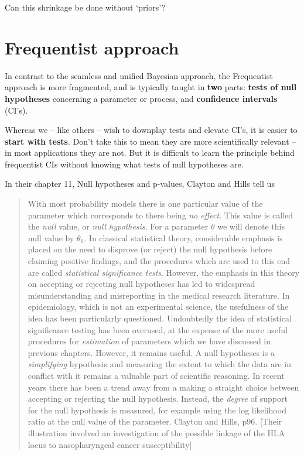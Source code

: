 \documentclass[]{book}
\begin{document}
Can this shrinkage be done without `priors'?

\hypertarget{frequentist-approach}{%
\section{Frequentist approach}\label{frequentist-approach}}

In contrast to the seamless and unified Bayesian approach, the Frequentist approach is more fragmented, and is typically taught in \textbf{two} parts: \textbf{tests of null hypotheses} concerning a parameter or process, and \textbf{confidence intervals} (CI's).

Whereas we -- like others -- wish to downplay tests and elevate CI's,
it is easier to \textbf{start with tests}. Don't take this to mean they are more scientifically relevant -- in most applications they are not. But it is difficult to learn the principle behind frequentist CIs without knowing what tests of null hypotheses are.

In their chapter 11, Null hypotheses and p-values, Clayton and Hills tell us

\begin{quote}
With most probability models there is one particular value of the parameter which corresponds to there being \emph{no effect}. This value is called the \emph{null} value, or \emph{null hypothesis}. For a parameter \(\theta\) we will denote this null value by \(\theta_0\). In classical statistical theory, considerable emphasis is placed on the need to disprove (or reject) the null hypothesis before claiming positive findings, and the procedures which are used to this end are called \emph{statistical significance tests}. However, the emphasis in this theory on accepting or
rejecting null hypotheses has led to widespread misunderstanding and misreporting in the medical research literature. In epidemiology, which is not an
experimental science, the usefulness of the idea has been particularly questioned. Undoubtedly the idea of statistical significance testing has been overused, at the expense of the more useful procedures for \emph{estimation}
of parameters which we have discussed in previous chapters. However, it remains useful. A null hypotheses is a \emph{simplifying} hypothesis and measuring the extent to which the data are in conflict with it remains a valuable part of scientific reasoning. In recent years there has been a trend away from a making a straight choice between accepting or rejecting the null
hypothesis. Instead, the \emph{degree} of support for the null hypothesis is measured, for example using the log likelihood ratio at the null value of the
parameter. Clayton and Hills, p96. {[}Their illustration involved an investigation of the possible linkage of the HLA locus to nasopharyngeal cancer susceptibility{]}
\end{quote}
\end{document}
